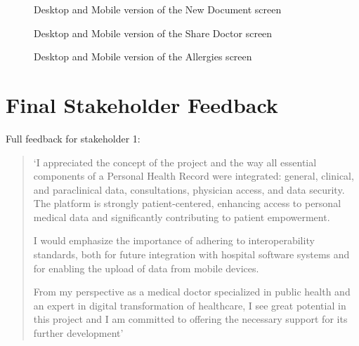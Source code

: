 \begin{figure}[ht]
    \centering
    \hspace{0.05\textwidth}
    \caption{Desktop and Mobile version of the New Document screen}\label{fig:newDoc_wireframe}
\end{figure}

\begin{figure}[ht]
    \centering
    \hspace{0.05\textwidth}
    \caption{Desktop and Mobile version of the Share Doctor screen}
\end{figure}

\begin{figure}[ht]
    \centering
    \hspace{0.05\textwidth}
    \caption{Desktop and Mobile version of the Allergies screen}
\end{figure}

\chapter{Final Stakeholder Feedback}\label{sec:full_feedback}

Full feedback for stakeholder 1:

\begin{quotation}
`I appreciated the concept of the project and the way all essential components of a Personal Health Record were integrated: general, clinical, and paraclinical data, consultations, physician access, and data security. The platform is strongly patient-centered, enhancing access to personal medical data and significantly contributing to patient empowerment.

I would emphasize the importance of adhering to interoperability standards, both for future integration with hospital software systems and for enabling the upload of data from mobile devices.

From my perspective as a medical doctor specialized in public health and an expert in digital transformation of healthcare, I see great potential in this project and I am committed to offering the necessary support for its further development'
\end{quotation}

